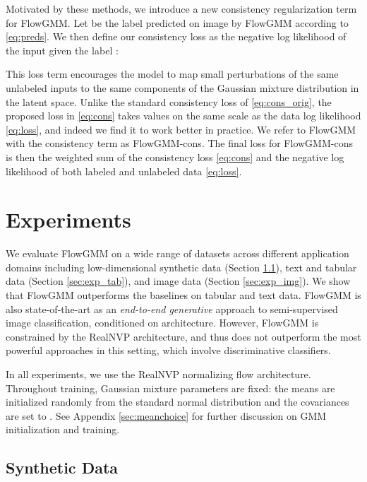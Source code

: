 \documentclass{article}
\newcommand{\method}{FlowGMM\xspace}
\newcommand{\methodcons}{FlowGMM-cons\xspace}
\begin{document}
Motivated by these methods, we introduce a new consistency regularization term for \method.
Let  be the label predicted on image  by \method according to \eqref{eq:preds}.
We then define our consistency loss as the negative log likelihood of the input  given the label :

This loss term encourages the
model to map small perturbations of the same unlabeled inputs to the same 
components of the Gaussian mixture distribution in the latent space.
Unlike the standard consistency loss of \eqref{eq:cons_orig}, the proposed loss in \eqref{eq:cons} takes values on the same scale as the data log likelihood \eqref{eq:loss}, and indeed we find it to work better in practice.
We refer to \method with the consistency term as \methodcons.
The final loss for \methodcons is then the weighted sum of the consistency loss \eqref{eq:cons} and the negative log likelihood of both labeled and unlabeled data \eqref{eq:loss}.

\section{Experiments}
\label{sec:exps}

We evaluate \method on a wide range of datasets across different application domains including low-dimensional synthetic data (Section \ref{sec:exp_toy}), text and tabular data (Section \ref{sec:exp_tab}), and image data (Section \ref{sec:exp_img}). 
We show that \method outperforms the baselines on tabular and text data. \method is also state-of-the-art as an \emph{end-to-end generative} approach to semi-supervised image classification, conditioned on architecture. However, \method is constrained by the RealNVP architecture, and thus does not outperform the most powerful approaches in this setting, which involve discriminative classifiers.

In all experiments, we use the RealNVP normalizing flow architecture. Throughout training, Gaussian mixture parameters are fixed:
the means are initialized randomly from the standard normal distribution and the covariances are set to . See Appendix \ref{sec:meanchoice} for further discussion on GMM initialization and training.


\subsection{Synthetic Data}
\label{sec:exp_toy}
\end{document}
